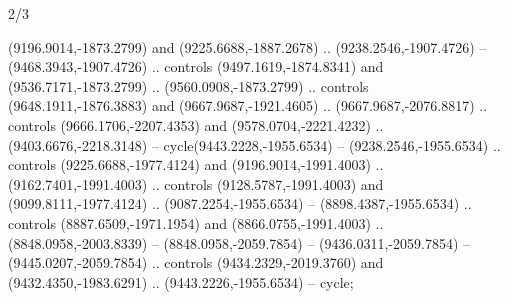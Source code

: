 \begin{flagdescription}{2/3}
\begin{scope}[xshift=0.5\flaglength,fill=white]
\begin{scope}[scale=0.00038\flagwidth,yshift=38.5mm,xshift=-705mm]
\begin{scope}[y=0.1mm, x=0.1mm, yscale=-1, xscale=1]
  (9196.9014,-1873.2799) and (9225.6688,-1887.2678) .. (9238.2546,-1907.4726) --
  (9468.3943,-1907.4726) .. controls (9497.1619,-1874.8341) and
  (9536.7171,-1873.2799) .. (9560.0908,-1873.2799) .. controls
  (9648.1911,-1876.3883) and (9667.9687,-1921.4605) .. (9667.9687,-2076.8817) ..
  controls (9666.1706,-2207.4353) and (9578.0704,-2221.4232) ..
  (9403.6676,-2218.3148) -- cycle(9443.2228,-1955.6534) --
  (9238.2546,-1955.6534) .. controls (9225.6688,-1977.4124) and
  (9196.9014,-1991.4003) .. (9162.7401,-1991.4003) .. controls
  (9128.5787,-1991.4003) and (9099.8111,-1977.4124) .. (9087.2254,-1955.6534) --
  (8898.4387,-1955.6534) .. controls (8887.6509,-1971.1954) and
  (8866.0755,-1991.4003) .. (8848.0958,-2003.8339) -- (8848.0958,-2059.7854) --
  (9436.0311,-2059.7854) -- (9445.0207,-2059.7854) .. controls
  (9434.2329,-2019.3760) and (9432.4350,-1983.6291) .. (9443.2226,-1955.6534) --
  cycle;
\end{scope}
\end{scope}
\end{scope}
\fi
\framecode{}
\end{flagdescription}
